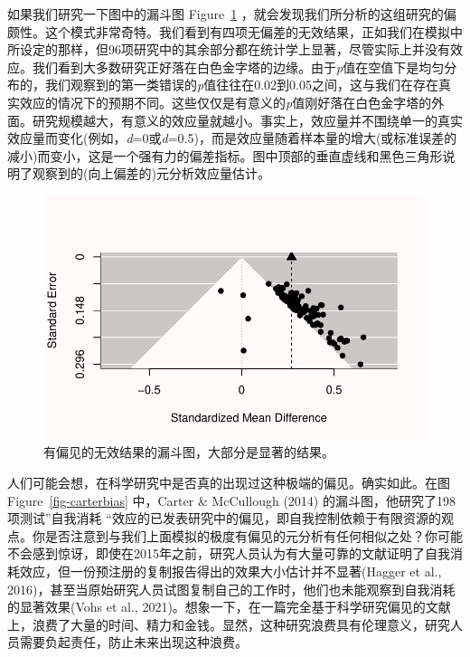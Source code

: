 \documentclass[
  letterpaper,
  DIV=11,
  numbers=noendperiod]{scrreprt}
\begin{document}
如果我们研究一下图中的漏斗图 Figure~\ref{fig-funnel2}
，就会发现我们所分析的这组研究的偏颇性。这个模式非常奇特。我们看到有四项无偏差的无效结果，正如我们在模拟中所设定的那样，但96项研究中的其余部分都在统计学上显著，尽管实际上并没有效应。我们看到大多数研究正好落在白色金字塔的边缘。由于\emph{p}值在空值下是均匀分布的，我们观察到的第一类错误的\emph{p}值往往在0.02到0.05之间，这与我们在存在真实效应的情况下的预期不同。这些仅仅是有意义的\emph{p}值刚好落在白色金字塔的外面。研究规模越大，有意义的效应量就越小。事实上，效应量并不围绕单一的真实效应量而变化(例如，\emph{d}=0或\emph{d}=0.5)，而是效应量随着样本量的增大(或标准误差的减小)而变小，这是一个强有力的偏差指标。图中顶部的垂直虚线和黑色三角形说明了观察到的(向上偏差的)元分析效应量估计。

\begin{figure}

{\centering \includegraphics[width=1\textwidth,height=\textheight]{12-bias_files/figure-pdf/fig-funnel2-1.pdf}

}

\caption{\label{fig-funnel2}有偏见的无效结果的漏斗图，大部分是显著的结果。}

\end{figure}

人们可能会想，在科学研究中是否真的出现过这种极端的偏见。确实如此。在图
Figure~\ref{fig-carterbias} 中，Carter \& McCullough (2014)
的漏斗图，他研究了198项测试''自我消耗
``效应的已发表研究中的偏见，即自我控制依赖于有限资源的观点。你是否注意到与我们上面模拟的极度有偏见的元分析有任何相似之处？你可能不会感到惊讶，即使在2015年之前，研究人员认为有大量可靠的文献证明了自我消耗效应，但一份预注册的复制报告得出的效果大小估计并不显著(Hagger
et al.,
2016)，甚至当原始研究人员试图复制自己的工作时，他们也未能观察到自我消耗的显著效果(Vohs
et al.,
2021)。想象一下，在一篇完全基于科学研究偏见的文献上，浪费了大量的时间、精力和金钱。显然，这种研究浪费具有伦理意义，研究人员需要负起责任，防止未来出现这种浪费。
\end{document}
